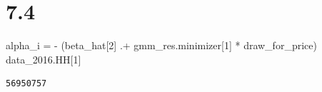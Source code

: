 \documentclass[
  letterpaper,
  DIV=11,
  numbers=noendperiod]{scrreprt}
\newenvironment{Shaded}{\begin{snugshade}}{\end{snugshade}}
\newcommand{\FloatTok}[1]{\textcolor[rgb]{0.68,0.00,0.00}{#1}}
\newcommand{\NormalTok}[1]{\textcolor[rgb]{0.00,0.23,0.31}{#1}}
\newcommand{\OperatorTok}[1]{\textcolor[rgb]{0.37,0.37,0.37}{#1}}
\begin{document}
\hypertarget{section-16}{%
\section{7.4}\label{section-16}}

\begin{Shaded}
\begin{Highlighting}[]
\NormalTok{alpha\_i }\OperatorTok{=} \OperatorTok{{-}}\NormalTok{ (beta\_hat[}\FloatTok{2}\NormalTok{] }\OperatorTok{.+}\NormalTok{ gmm\_res.minimizer[}\FloatTok{1}\NormalTok{] }\OperatorTok{*}\NormalTok{ draw\_for\_price)}
\NormalTok{data\_2016.HH[}\FloatTok{1}\NormalTok{]}
\end{Highlighting}
\end{Shaded}

\begin{verbatim}
56950757
\end{verbatim}
\end{document}
